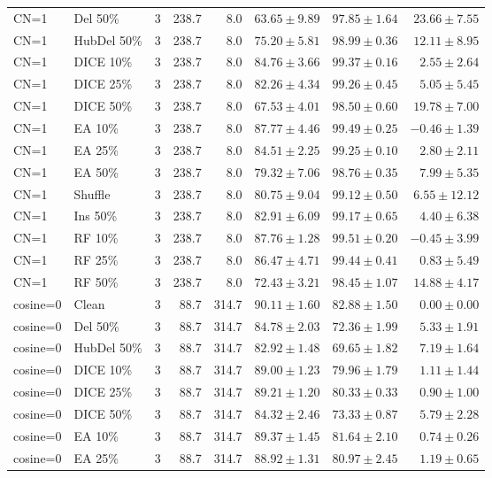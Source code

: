 {\begin{longtable}{llrrrrrr}
CN=1 & Del 50\% & 3 & 238.7 & 8.0 & $63.65\pm9.89$ & $97.85\pm1.64$ & $23.66\pm7.55$ \\
CN=1 & HubDel 50\% & 3 & 238.7 & 8.0 & $75.20\pm5.81$ & $98.99\pm0.36$ & $12.11\pm8.95$ \\
CN=1 & DICE 10\% & 3 & 238.7 & 8.0 & $84.76\pm3.66$ & $99.37\pm0.16$ & $2.55\pm2.64$ \\
CN=1 & DICE 25\% & 3 & 238.7 & 8.0 & $82.26\pm4.34$ & $99.26\pm0.45$ & $5.05\pm5.45$ \\
CN=1 & DICE 50\% & 3 & 238.7 & 8.0 & $67.53\pm4.01$ & $98.50\pm0.60$ & $19.78\pm7.00$ \\
CN=1 & EA 10\% & 3 & 238.7 & 8.0 & $87.77\pm4.46$ & $99.49\pm0.25$ & $-0.46\pm1.39$ \\
CN=1 & EA 25\% & 3 & 238.7 & 8.0 & $84.51\pm2.25$ & $99.25\pm0.10$ & $2.80\pm2.11$ \\
CN=1 & EA 50\% & 3 & 238.7 & 8.0 & $79.32\pm7.06$ & $98.76\pm0.35$ & $7.99\pm5.35$ \\
CN=1 & Shuffle & 3 & 238.7 & 8.0 & $80.75\pm9.04$ & $99.12\pm0.50$ & $6.55\pm12.12$ \\
CN=1 & Ins 50\% & 3 & 238.7 & 8.0 & $82.91\pm6.09$ & $99.17\pm0.65$ & $4.40\pm6.38$ \\
CN=1 & RF 10\% & 3 & 238.7 & 8.0 & $87.76\pm1.28$ & $99.51\pm0.20$ & $-0.45\pm3.99$ \\
CN=1 & RF 25\% & 3 & 238.7 & 8.0 & $86.47\pm4.71$ & $99.44\pm0.41$ & $0.83\pm5.49$ \\
CN=1 & RF 50\% & 3 & 238.7 & 8.0 & $72.43\pm3.21$ & $98.45\pm1.07$ & $14.88\pm4.17$ \\
cosine=0 & Clean & 3 & 88.7 & 314.7 & $90.11\pm1.60$ & $82.88\pm1.50$ & $0.00\pm0.00$ \\
cosine=0 & Del 50\% & 3 & 88.7 & 314.7 & $84.78\pm2.03$ & $72.36\pm1.99$ & $5.33\pm1.91$ \\
cosine=0 & HubDel 50\% & 3 & 88.7 & 314.7 & $82.92\pm1.48$ & $69.65\pm1.82$ & $7.19\pm1.64$ \\
cosine=0 & DICE 10\% & 3 & 88.7 & 314.7 & $89.00\pm1.23$ & $79.96\pm1.79$ & $1.11\pm1.44$ \\
cosine=0 & DICE 25\% & 3 & 88.7 & 314.7 & $89.21\pm1.20$ & $80.33\pm0.33$ & $0.90\pm1.00$ \\
cosine=0 & DICE 50\% & 3 & 88.7 & 314.7 & $84.32\pm2.46$ & $73.33\pm0.87$ & $5.79\pm2.28$ \\
cosine=0 & EA 10\% & 3 & 88.7 & 314.7 & $89.37\pm1.45$ & $81.64\pm2.10$ & $0.74\pm0.26$ \\
cosine=0 & EA 25\% & 3 & 88.7 & 314.7 & $88.92\pm1.31$ & $80.97\pm2.45$ & $1.19\pm0.65$ \\

\end{longtable}}
